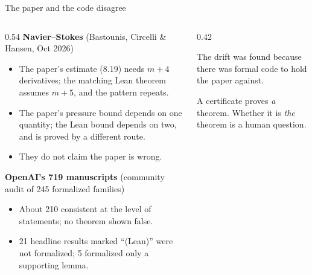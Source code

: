 \begin{frame}{The paper and the code disagree}
  \small\sffamily
  \begin{columns}[T]
    \begin{column}{0.54\textwidth}
      \textbf{Navier--Stokes} (Bastounis, Circelli \& Hansen, Oct 2026)
      \begin{itemize}\footnotesize
        \item The paper's estimate (8.19) needs $m{+}4$ derivatives; the matching Lean theorem assumes $m{+}5$, and the pattern repeats.
        \item The paper's pressure bound depends on one quantity; the Lean bound depends on two, and is proved by a different route.
        \item They do not claim the paper is wrong.
      \end{itemize}
      \medskip
      \textbf{OpenAI's 719 manuscripts} (community audit of 245 formalized families)
      \begin{itemize}\footnotesize
        \item About 210 consistent at the level of statements; no theorem shown false.
        \item 21 headline results marked ``(Lean)'' were not formalized; 5 formalized only a supporting lemma.
      \end{itemize}
    \end{column}
    \begin{column}{0.42\textwidth}
      \vspace{0.4cm}
      \vspace{0.5cm}

      {\footnotesize The drift was found because there was formal code to hold the paper against.\par\smallskip
       A certificate proves \emph{a} theorem. Whether it is \emph{the} theorem is a human question.}
    \end{column}
  \end{columns}
\end{frame}

